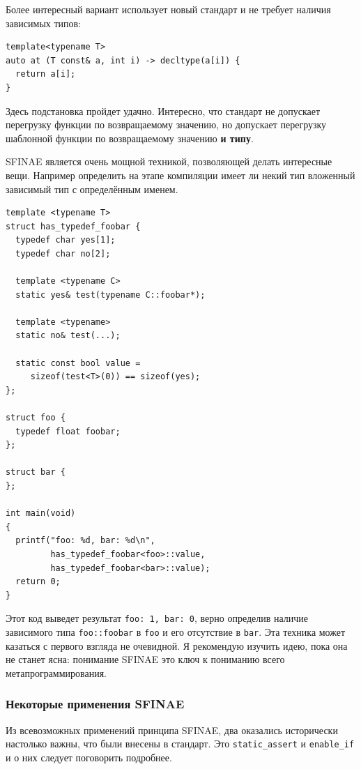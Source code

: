 \documentclass[a4paper,12pt,oneside]{article}
\begin{document}
Более интересный вариант использует новый стандарт и не требует наличия зависимых типов:

\begin{lstlisting}
template<typename T>
auto at (T const& a, int i) -> decltype(a[i]) {
  return a[i];
}
\end{lstlisting}

Здесь подстановка пройдет удачно. Интересно, что стандарт не допускает перегрузку функции по возвращаемому значению, но допускает перегрузку шаблонной функции по возвращаемому значению \textbf{и типу}.

SFINAE является очень мощной техникой, позволяющей делать интересные вещи. Например определить на этапе компиляции имеет ли некий тип вложенный зависимый тип с определённым именем.

\begin{lstlisting}
template <typename T>
struct has_typedef_foobar {
  typedef char yes[1];
  typedef char no[2];
 
  template <typename C>
  static yes& test(typename C::foobar*);
 
  template <typename>
  static no& test(...);
 
  static const bool value = 
     sizeof(test<T>(0)) == sizeof(yes);
};

struct foo {    
  typedef float foobar;
};

struct bar {    
};

int main(void)
{
  printf("foo: %d, bar: %d\n", 
         has_typedef_foobar<foo>::value,
         has_typedef_foobar<bar>::value);
  return 0;
}
\end{lstlisting}

Этот код выведет результат \lstinline!foo: 1, bar: 0!, верно определив наличие зависимого типа \lstinline!foo::foobar! в \lstinline!foo! и его отсутствие в \lstinline!bar!. Эта техника может казаться с первого взгляда не очевидной. Я рекомендую изучить идею, пока она не станет ясна: понимание SFINAE это ключ к пониманию всего метапрограммирования.

\subsubsection{Некоторые применения SFINAE}

Из всевозможных применений принципа SFINAE, два оказались исторически настолько важны, что были внесены в стандарт. Это \lstinline!static_assert! и \lstinline!enable_if! и о них следует поговорить подробнее.
\end{document}
